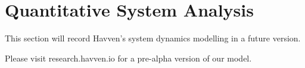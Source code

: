 \section{Quantitative System Analysis}

This section will record Havven's system dynamics modelling in a future version.

Please visit research.havven.io for a pre-alpha version of our model.

\hfill